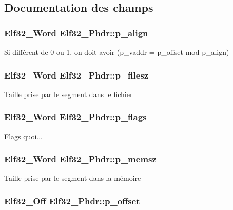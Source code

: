 \subsection{Documentation des champs}
\hypertarget{structElf32__Phdr_afd09d9e4297b13fc94fd57d09f2a9f70}{
\subsubsection[{p\+\_\+align}]{\setlength{\rightskip}{0pt plus 5cm}Elf32\+\_\+\+Word Elf32\+\_\+\+Phdr\+::p\+\_\+align}}\label{structElf32__Phdr_afd09d9e4297b13fc94fd57d09f2a9f70}
Si différent de 0 ou 1, on doit avoir (p\+\_\+vaddr = p\+\_\+offset mod p\+\_\+align) \hypertarget{structElf32__Phdr_ac9151f2e11001284bf1c7d2d2659555c}{
\subsubsection[{p\+\_\+filesz}]{\setlength{\rightskip}{0pt plus 5cm}Elf32\+\_\+\+Word Elf32\+\_\+\+Phdr\+::p\+\_\+filesz}}\label{structElf32__Phdr_ac9151f2e11001284bf1c7d2d2659555c}
Taille prise par le segment dans le fichier \hypertarget{structElf32__Phdr_a35c457e6828894b7b275730593802050}{
\subsubsection[{p\+\_\+flags}]{\setlength{\rightskip}{0pt plus 5cm}Elf32\+\_\+\+Word Elf32\+\_\+\+Phdr\+::p\+\_\+flags}}\label{structElf32__Phdr_a35c457e6828894b7b275730593802050}
Flags quoi... \hypertarget{structElf32__Phdr_ada1cdd3d6ccb79a17bed0e3c21379c84}{
\subsubsection[{p\+\_\+memsz}]{\setlength{\rightskip}{0pt plus 5cm}Elf32\+\_\+\+Word Elf32\+\_\+\+Phdr\+::p\+\_\+memsz}}\label{structElf32__Phdr_ada1cdd3d6ccb79a17bed0e3c21379c84}
Taille prise par le segment dans la mémoire \hypertarget{structElf32__Phdr_ac590d4c4b26104216e53058b5b03eef0}{
\subsubsection[{p\+\_\+offset}]{\setlength{\rightskip}{0pt plus 5cm}Elf32\+\_\+\+Off Elf32\+\_\+\+Phdr\+::p\+\_\+offset}}\label{structElf32__Phdr_ac590d4c4b26104216e53058b5b03eef0}
